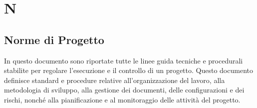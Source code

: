 \section{N} 
\subsection{Norme di Progetto} 
In questo documento sono riportate tutte le linee guida tecniche e procedurali stabilite per regolare l'esecuzione e il controllo di un progetto. Questo documento definisce standard e procedure relative all'organizzazione del lavoro, alla metodologia di sviluppo, alla gestione dei documenti, delle configurazioni e dei rischi, nonché alla pianificazione e al monitoraggio delle attività del progetto. 
